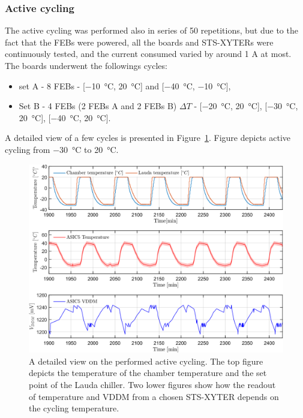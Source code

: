 \subsubsection{Active cycling}
The active cycling was performed also in series of 50 repetitions, but due to the fact that the \glspl{FEB} were powered, all the boards and STS-XYTERs were continuously tested, and the current consumed varied by around 1 A at most. The boards underwent the followings cycles:
\begin{itemize}
    \item set A - 8 \glspl{FEB} - [\SI{-10}{\celsius}, \SI{20}{\celsius}] and [\SI{-40}{\celsius}, \SI{-10}{\celsius}],
    \item Set B - 4 \glspl{FEB} (2 \glspl{FEB} A and 2 \glspl{FEB} B)  $\Delta T$ - [\SI{-20}{\celsius}, \SI{20}{\celsius}], [\SI{-30}{\celsius}, \SI{20}{\celsius}], [\SI{-40}{\celsius}, \SI{20}{\celsius}].
\end{itemize}
A detailed view of a few cycles is presented in Figure~\ref{fig_active_detailed}. Figure depicts active cycling from \SI{-30}{\celsius} to \SI{20}{\celsius}.
\begin{figure}[!h]
\centering
\includegraphics[width=0.65\columnwidth]{Chapter4/images/FEB0ASIC5COMP.png}
\caption{A detailed view on the performed active cycling. The top figure depicts the temperature of the chamber temperature and the set point of the Lauda chiller. Two lower figures show how the readout of temperature and VDDM from a chosen STS-XYTER depends on the cycling temperature. }
\label{fig_active_detailed}
\end{figure}

